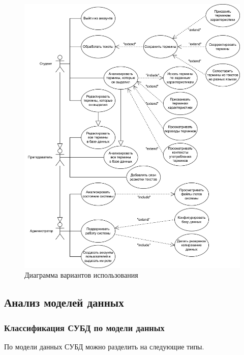 \begin{figure}[h]
	\centering
	\includegraphics[width=\textwidth ]{img/Use-case/Use-case.drawio.png}
	\caption{Диаграмма вариантов использования}
	\label{fig:use-case}
\end{figure} 

\clearpage



\subsection{Анализ моделей данных}

\subsubsection{Классификация СУБД по модели данных}

По модели данных СУБД можно разделить на следующие типы.

